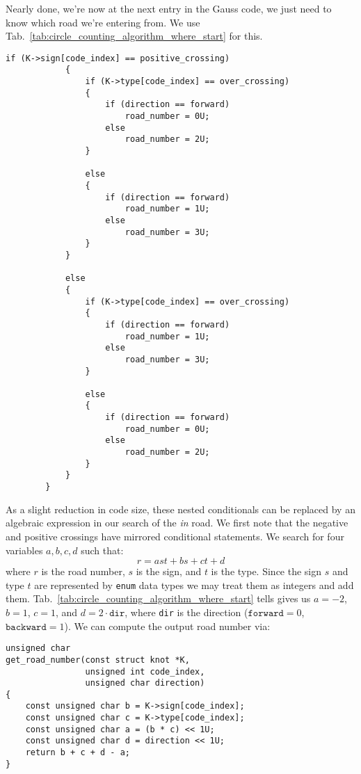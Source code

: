         Nearly done, we're now at the next entry in the Gauss code, we just need
        to know which road we're entering from. We use
        Tab.~\ref{tab:circle_counting_algorithm_where_start} for this.
\begin{lstlisting}[style=CStyle, firstnumber = 118]
            if (K->sign[code_index] == positive_crossing)
            {
                if (K->type[code_index] == over_crossing)
                {
                    if (direction == forward)
                        road_number = 0U;
                    else
                        road_number = 2U;
                }

                else
                {
                    if (direction == forward)
                        road_number = 1U;
                    else
                        road_number = 3U;
                }
            }

            else
            {
                if (K->type[code_index] == over_crossing)
                {
                    if (direction == forward)
                        road_number = 1U;
                    else
                        road_number = 3U;
                }

                else
                {
                    if (direction == forward)
                        road_number = 0U;
                    else
                        road_number = 2U;
                }
            }
        }
\end{lstlisting}
        As a slight reduction in code size, these nested conditionals can be
        replaced by an algebraic expression in our search of the
        \textit{in} road. We first note that the negative and positive crossings
        have mirrored conditional statements. We search for four variables
        $a,b,c,d$ such that:
        \begin{equation}
            r=ast+bs+ct+d
        \end{equation}
        where $r$ is the road number, $s$ is the sign, and $t$ is the type.
        Since the sign $s$ and type $t$ are represented by \texttt{enum} data
        types we may treat them as integers and add them.
        Tab.~\ref{tab:circle_counting_algorithm_where_start} tells gives us
        $a=-2$, $b=1$, $c=1$, and $d=2\cdot\texttt{dir}$, where \texttt{dir} is
        the direction ($\texttt{forward}=0$, $\texttt{backward}=1$). We can
        compute the output road number via:
\begin{lstlisting}[style=CStyle]
unsigned char
get_road_number(const struct knot *K,
                unsigned int code_index,
                unsigned char direction)
{
    const unsigned char b = K->sign[code_index];
    const unsigned char c = K->type[code_index];
    const unsigned char a = (b * c) << 1U;
    const unsigned char d = direction << 1U;
    return b + c + d - a;
}
\end{lstlisting}
